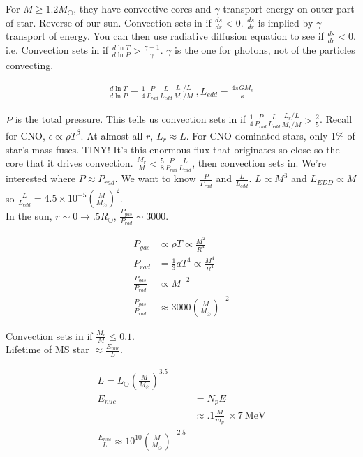 \documentclass[10pt,letterpaper,final]{book}
\newcommand{\pt}{\propto}
\begin{document}
For $M \geq 1.2 M_\odot$, they have convective cores and $\gamma$ transport energy on outer part of star. Reverse of our sun. Convection sets in if $\frac{ds}{dr} < 0$. $\frac{ds}{dr}$ is implied by $\gamma$ transport of energy. You can then use radiative diffusion equation to see if $\frac{ds}{dr}<0$. i.e. Convection sets in if $\frac{d \ln T}{d \ln P} > \frac{\gamma -1}{\gamma}$. $\gamma$ is the one for photons, not of the particles convecting. 

\begin{align}
\frac{d \ln T}{d \ln P}  = \frac{1}{4} \frac{P}{P_{rad}}\frac{L}{L_{edd}}\frac{L_r/L}{M_r/M}~,L_{edd} = \frac{4 \pi G M_c}{\kappa}
\end{align}

$P$ is the total pressure. This tells us convection sets in if $\frac{1}{4} \frac{P}{P_{rad}}\frac{L}{L_{edd}}\frac{L_r/L}{M_r/M} > \frac{2}{5}$. Recall for CNO, $\epsilon \pt \rho T^\beta$. At almost all $r$, $L_r \approx L$. For CNO-dominated stars, only 1\% of star's mass fuses. TINY! It's this enormous flux that originates so close so the core that it drives convection. $\frac{M_r}{M} < \frac{5}{8} \frac{P}{P_{rad}}\frac{L}{L_{edd}}$, then convection sets in. We're interested where $P \approx P_{rad}$. We want to know $\frac{P}{P_{rad}}$ and $\frac{L}{L_{edd}}$. $L \pt M^3$ and $L_{EDD} \pt M$ so $\frac{L}{L_{edd}} = 4.5 \times 10^{-5} \left( \frac{M}{M_\odot} \right)^2$. \\

In the sun, $r \sim 0 \rightarrow .5 R_\odot$, $\frac{P_{gas}}{P_{rad}} \sim 3000$.

\begin{align}
P_{gas} &\pt \rho T \pt \frac{M^2}{R^4}\\
P_{rad}& = \frac{1}{3}a T^4 \pt \frac{M^4}{R^4}\\
\frac{P_{gas}}{P_{rad}} &\pt M^{-2}\\
\frac{P_{gas}}{P_{rad}} &\approx 3000 \left( \frac{M}{M_\odot} \right)^{-2}
\end{align}

Convection sets in if $\frac{M_r}{M} \leq 0.1$. \\

Lifetime of MS star $\approx \frac{E_{nuc}}{L}$. 

\begin{align}
L = L_\odot \left( \frac{M}{M_\odot} \right)^{3.5}\\
E_{nuc} &= N_p E\\
&  \approx  .1 \frac{M}{m_p}~\times 7 ~\text{MeV}\\
\frac{E_{nuc}}{L} \approx 10^{10} \left( \frac{M}{M_\odot} \right)^{-2.5}
\end{align}
\end{document}
